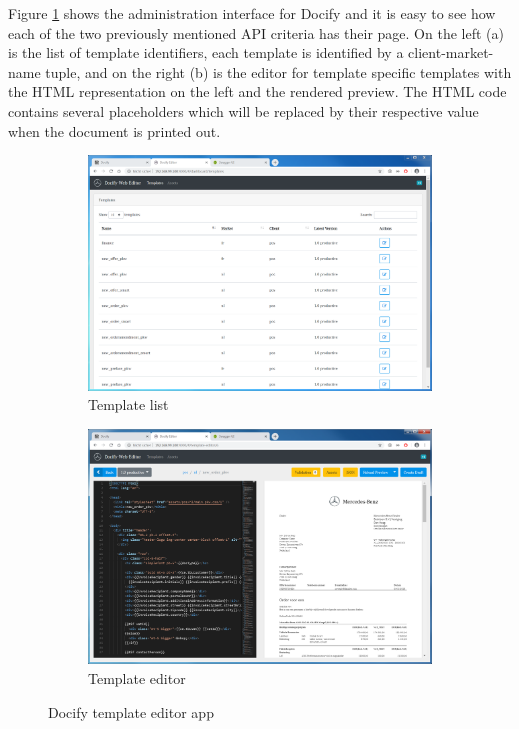 Figure \ref{fig:docify} shows the administration interface for Docify and it is easy to see how each of the two previously mentioned API criteria has their page. On the left (a) is the list of template identifiers, each template is identified by a client-market-name tuple, and on the right (b) is the editor for template specific templates with the HTML representation on the left and the rendered preview. The HTML code contains several placeholders which will be replaced by their respective value when the document is printed out.

\begin{figure}
  \begin{subfigure}[b]{0.5\linewidth}
    \includegraphics[width=\linewidth]{assets/docify-template-list.png}
    \caption{Template list}
  \end{subfigure}
  \begin{subfigure}[b]{0.5\linewidth}
    \includegraphics[width=\linewidth]{assets/docify-editor.png}
    \caption{Template editor}
  \end{subfigure}
  \caption{Docify template editor app}
  \label{fig:docify}
\end{figure}

